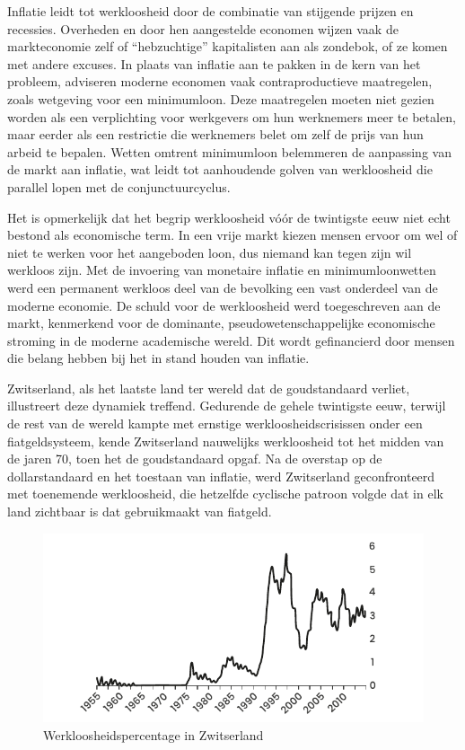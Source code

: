 Inflatie leidt tot werkloosheid door de combinatie van stijgende prijzen en recessies. Overheden en door hen aangestelde economen wijzen vaak de markteconomie zelf of ``hebzuchtige'' kapitalisten aan als zondebok, of ze komen met andere excuses. In plaats van inflatie aan te pakken in de kern van het probleem, adviseren moderne economen vaak contraproductieve maatregelen, zoals wetgeving voor een minimumloon. Deze maatregelen moeten niet gezien worden als een verplichting voor werkgevers om hun werknemers meer te betalen, maar eerder als een restrictie die werknemers belet om zelf de prijs van hun arbeid te bepalen. Wetten omtrent minimumloon belemmeren de aanpassing van de markt aan inflatie, wat leidt tot aanhoudende golven van werkloosheid die parallel lopen met de conjunctuurcyclus.

Het is opmerkelijk dat het begrip werkloosheid vóór de twintigste eeuw
niet echt bestond als economische term. In een vrije markt kiezen mensen
ervoor om wel of niet te werken voor het aangeboden loon, dus niemand
kan tegen zijn wil werkloos zijn. Met de invoering van monetaire
inflatie en minimumloonwetten werd een permanent werkloos deel van de
bevolking een vast onderdeel van de moderne economie. De schuld voor de
werkloosheid werd toegeschreven aan de markt, kenmerkend voor de
dominante, pseudowetenschappelijke economische stroming in de moderne
academische wereld. Dit wordt gefinancierd door mensen die belang hebben
bij het in stand houden van inflatie.

Zwitserland, als het laatste land ter wereld dat de goudstandaard verliet, illustreert deze dynamiek treffend. Gedurende de gehele twintigste eeuw, terwijl de rest van de wereld kampte met ernstige werkloosheidscrisissen onder een fiatgeldsysteem, kende Zwitserland nauwelijks werkloosheid tot het midden van de jaren 70, toen het de goudstandaard opgaf.\autocite{42} Na de overstap op de dollarstandaard en het toestaan van inflatie, werd Zwitserland geconfronteerd met toenemende werkloosheid, die hetzelfde cyclische patroon volgde dat in elk land zichtbaar is dat gebruikmaakt van fiatgeld.

\begin{figure}[!htb]
\centering
    \includegraphics[width=\textwidth]{figures/fig7.pdf}
\caption[Werkloosheidspercentage in Zwitserland]{Werkloosheidspercentage in Zwitserland}
\label{fig7}
\end{figure}

